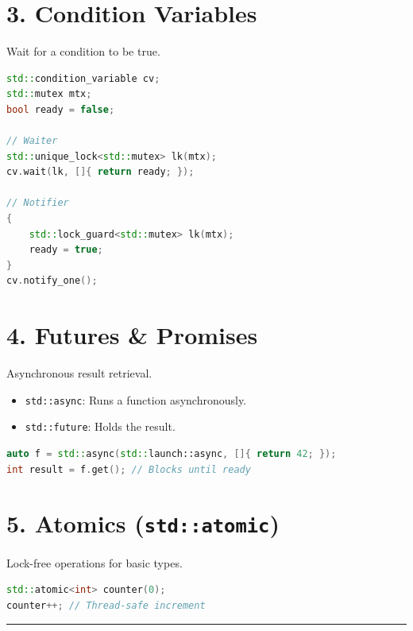 \hypertarget{condition-variables}{%
\section{3. Condition Variables}\label{condition-variables}}

Wait for a condition to be true.

\begin{lstlisting}[language={C++}]
std::condition_variable cv;
std::mutex mtx;
bool ready = false;

// Waiter
std::unique_lock<std::mutex> lk(mtx);
cv.wait(lk, []{ return ready; });

// Notifier
{
    std::lock_guard<std::mutex> lk(mtx);
    ready = true;
}
cv.notify_one();
\end{lstlisting}

\hypertarget{futures-promises}{%
\section{4. Futures \& Promises}\label{futures-promises}}

Asynchronous result retrieval.

\begin{itemize}
\tightlist
\item
  \passthrough{\lstinline!std::async!}: Runs a function asynchronously.
\item
  \passthrough{\lstinline!std::future!}: Holds the result.
\end{itemize}

\begin{lstlisting}[language={C++}]
auto f = std::async(std::launch::async, []{ return 42; });
int result = f.get(); // Blocks until ready
\end{lstlisting}

\hypertarget{atomics-stdatomic}{%
\section{\texorpdfstring{5. Atomics
(\texttt{std::atomic})}{5. Atomics (std::atomic)}}\label{atomics-stdatomic}}

Lock-free operations for basic types.

\begin{lstlisting}[language={C++}]
std::atomic<int> counter(0);
counter++; // Thread-safe increment
\end{lstlisting}

\begin{center}\rule{0.5\linewidth}{0.5pt}\end{center}


